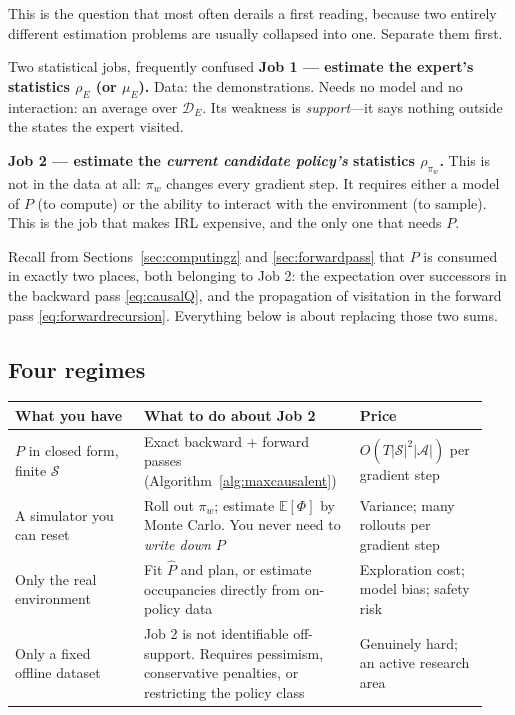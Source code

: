\documentclass[11pt]{article}
\theoremstyle{plain}
\theoremstyle{definition}
\theoremstyle{remark}
\renewcommand{\S}{\mathcal{S}}
\newcommand{\A}{\mathcal{A}}
\newcommand{\E}{\mathbb{E}}
\begin{document}
This is the question that most often derails a first reading, because two
entirely different estimation problems are usually collapsed into one.
Separate them first.

\begin{graybox}{Two statistical jobs, frequently confused}
\textbf{Job 1 --- estimate the expert's statistics $\rho_E$ (or $\mu_E$).}
Data: the demonstrations. Needs no model and no interaction: an average
over $\mathcal{D}_E$. Its weakness is \emph{support}---it says nothing
outside the states the expert visited.

\medskip
\textbf{Job 2 --- estimate the \emph{current candidate policy's}
statistics $\rho_{\pi_w}$.}
This is not in the data at all: $\pi_w$ changes every gradient step. It
requires either a model of $P$ (to compute) or the ability to interact
with the environment (to sample). This is the job that makes IRL
expensive, and the only one that needs $P$.
\end{graybox}

Recall from Sections~\ref{sec:computingz} and \ref{sec:forwardpass} that
$P$ is consumed in exactly two places, both belonging to Job 2: the
expectation over successors in the backward pass \eqref{eq:causalQ}, and
the propagation of visitation in the forward pass
\eqref{eq:forwardrecursion}. Everything below is about replacing those two
sums.

\subsection{Four regimes}

\begin{center}
\begin{tabular}{@{}p{0.26\linewidth}p{0.42\linewidth}p{0.26\linewidth}@{}}
\toprule
\textbf{What you have} & \textbf{What to do about Job 2} & \textbf{Price}\\
\midrule
$P$ in closed form, finite $\S$ & Exact backward + forward passes
(Algorithm~\ref{alg:maxcausalent}) & $O(T|\S|^2|\A|)$ per gradient step\\
A simulator you can reset & Roll out $\pi_w$; estimate $\E[\Phi]$ by Monte
Carlo. You never need to \emph{write down} $P$ & Variance; many rollouts
per gradient step\\
Only the real environment & Fit $\widehat P$ and plan, or estimate
occupancies directly from on-policy data & Exploration cost; model bias;
safety risk\\
Only a fixed offline dataset & Job 2 is not identifiable off-support.
Requires pessimism, conservative penalties, or restricting the policy
class & Genuinely hard; an active research area\\
\bottomrule
\end{tabular}
\end{center}
\end{document}

